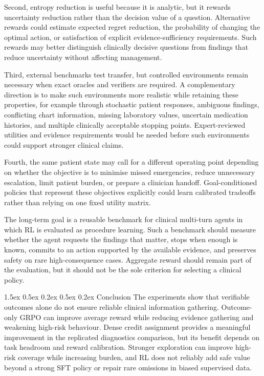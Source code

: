 \documentclass{article}
\makeatletter
\renewcommand{\paragraph}{%
  \@startsection{paragraph}{4}{\z@}%
                {1.5ex \@plus 0.5ex \@minus 0.2ex}%
                {0.5ex \@plus 0.2ex}%
                {\normalsize\bf}}
\makeatother
\begin{document}
Second, entropy reduction is useful because it is analytic, but it rewards
uncertainty reduction rather than the decision value of a question. Alternative
rewards could estimate expected regret reduction, the probability of changing the
optimal action, or satisfaction of explicit evidence-sufficiency requirements.
Such rewards may better distinguish clinically decisive questions from findings
that reduce uncertainty without affecting management.

Third, external benchmarks test transfer, but controlled environments remain
necessary when exact oracles and verifiers are required. A complementary direction
is to make such environments more realistic while retaining these properties, for
example through stochastic patient responses, ambiguous findings, conflicting
chart information, missing laboratory values, uncertain medication histories, and
multiple clinically acceptable stopping points. Expert-reviewed utilities and
evidence requirements would be needed before such environments could support
stronger clinical claims.

Fourth, the same patient state may call for a different operating point depending
on whether the objective is to minimise missed emergencies, reduce unnecessary
escalation, limit patient burden, or prepare a clinician handoff. Goal-conditioned
policies that represent these objectives explicitly could learn calibrated
tradeoffs rather than relying on one fixed utility matrix.

The long-term goal is a reusable benchmark for clinical multi-turn agents in which
RL is evaluated as procedure learning. Such a benchmark should measure whether the
agent requests the findings that matter, stops when enough is known, commits to an
action supported by the available evidence, and preserves safety on rare
high-consequence cases. Aggregate reward should remain part of the evaluation, but
it should not be the sole criterion for selecting a clinical policy.

\paragraph{Conclusion}
The experiments show that verifiable outcomes alone do not ensure reliable
clinical information gathering. Outcome-only GRPO can improve average reward while
reducing evidence gathering and weakening high-risk behaviour. Dense credit
assignment provides a meaningful improvement in the replicated diagnostics
comparison, but its benefit depends on task headroom and reward calibration.
Stronger exploration can improve high-risk coverage while increasing burden, and
RL does not reliably add safe value beyond a strong SFT policy or repair rare omissions
in biased supervised data.
\end{document}
